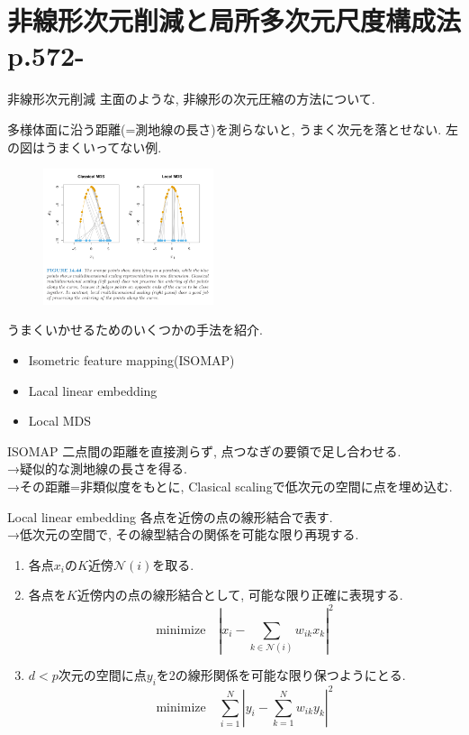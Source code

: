 \documentclass[dvipdfmx,8pt]{beamer}
\begin{document}
  \section{非線形次元削減と局所多次元尺度構成法\\p.572-}
  \begin{frame}{非線形次元削減}
    主面のような, 非線形の次元圧縮の方法について.

    多様体面に沿う距離(=測地線の長さ)を測らないと, うまく次元を落とせない. 左の図はうまくいってない例.
    \begin{figure}[htb]
      \centering
      \includegraphics[width=5cm,clip]{images/reducedimension-fail.png}
    \end{figure}

    うまくいかせるためのいくつかの手法を紹介.
    \begin{itemize}
      \item Isometric feature mapping(ISOMAP)
      \item Lacal linear embedding
      \item Local MDS
    \end{itemize}
  \end{frame}
  \begin{frame}{ISOMAP}
    二点間の距離を直接測らず, 点つなぎの要領で足し合わせる. \\
    →疑似的な測地線の長さを得る. \\
    →その距離=非類似度をもとに, Clasical scalingで低次元の空間に点を埋め込む.
  \end{frame}
  \begin{frame}{Local linear embedding}
    各点を近傍の点の線形結合で表す. \\
    →低次元の空間で, その線型結合の関係を可能な限り再現する.

    \begin{enumerate}
      \item 各点$x_i$の$K$近傍$\mathcal{N}(i)$を取る.
      \item 各点を$K$近傍内の点の線形結合として, 可能な限り正確に表現する.
        \[
          \mathrm{minimize} \quad |x_i-\sum_{k\in\mathcal{N}(i)}w_{ik}x_k|^2
        \]
      \item $d < p$次元の空間に点$y_i$を2の線形関係を可能な限り保つようにとる.
        \[
          \mathrm{minimize} \quad \sum_{i=1}^N|y_i-\sum_{k=1}^Nw_{ik}y_k|^2
        \]
    \end{enumerate}
  \end{frame}
\end{document}
